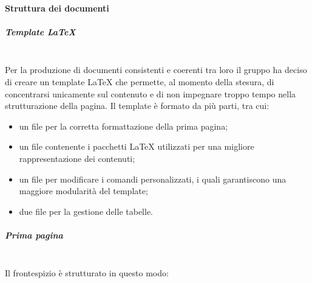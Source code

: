         \paragraph{Struttura dei documenti}
        \setlength{\parindent}{0cm}
            \subparagraph{Template \LaTeX}\mbox{}\\ [1mm]
                Per la produzione di documenti consistenti e coerenti tra loro il gruppo ha deciso di creare un template \LaTeX \xspace che permette, al momento della
                stesura, di concentrarsi unicamente sul contenuto e di non impegnare troppo tempo nella strutturazione della pagina. Il template è formato da
                più parti, tra cui:
                \begin{itemize}
                    \item un file per la corretta formattazione della prima pagina;
                    \item un file contenente i pacchetti \LaTeX \xspace utilizzati per una migliore rappresentazione dei contenuti;
                    \item un file per modificare i comandi personalizzati, i quali garantiscono una maggiore modularità del template;
                    \item due file per la gestione delle tabelle.
                \end{itemize}
            \subparagraph{Prima pagina}\mbox{}\\ [1mm]
                Il frontespizio è strutturato in questo modo:
